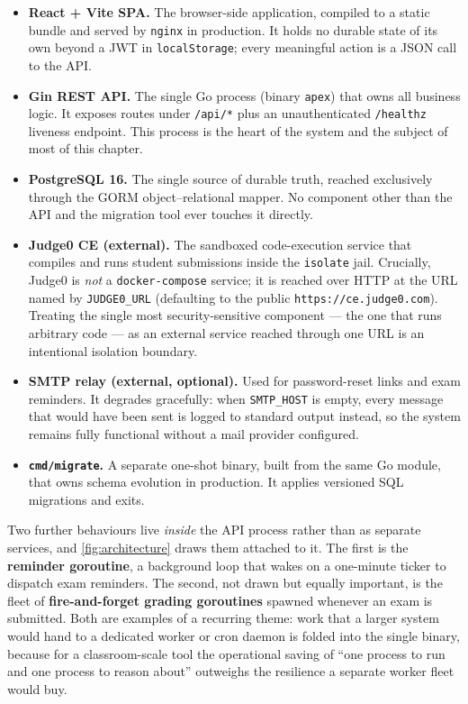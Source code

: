 \begin{itemize}
  \item \textbf{React + Vite SPA.} The browser-side application, compiled to a
        static bundle and served by \texttt{nginx} in production. It holds no
        durable state of its own beyond a JWT in \texttt{localStorage}; every
        meaningful action is a JSON call to the API.
  \item \textbf{Gin REST API.} The single Go process (binary \texttt{apex})
        that owns all business logic. It exposes routes under \texttt{/api/*}
        plus an unauthenticated \texttt{/healthz} liveness endpoint. This
        process is the heart of the system and the subject of most of this
        chapter.
  \item \textbf{PostgreSQL 16.} The single source of durable truth, reached
        exclusively through the GORM object--relational mapper. No component
        other than the API and the migration tool ever touches it directly.
  \item \textbf{Judge0 CE (external).} The sandboxed code-execution service
        that compiles and runs student submissions inside the \texttt{isolate}
        jail. Crucially, Judge0 is \emph{not} a \texttt{docker-compose} service;
        it is reached over HTTP at the URL named by \texttt{JUDGE0\_URL}
        (defaulting to the public \texttt{https://ce.judge0.com}). Treating the
        single most security-sensitive component --- the one that runs
        arbitrary code --- as an external service reached through one URL is an
        intentional isolation boundary.
  \item \textbf{SMTP relay (external, optional).} Used for password-reset links
        and exam reminders. It degrades gracefully: when \texttt{SMTP\_HOST} is
        empty, every message that would have been sent is logged to standard
        output instead, so the system remains fully functional without a mail
        provider configured.
  \item \textbf{\texttt{cmd/migrate}.} A separate one-shot binary, built from
        the same Go module, that owns schema evolution in production. It applies
        versioned SQL migrations and exits.
\end{itemize}

Two further behaviours live \emph{inside} the API process rather than as
separate services, and \cref{fig:architecture} draws them attached to it. The
first is the \textbf{reminder goroutine}, a background loop that wakes on a
one-minute ticker to dispatch exam reminders. The second, not drawn but equally
important, is the fleet of \textbf{fire-and-forget grading goroutines} spawned
whenever an exam is submitted. Both are examples of a recurring theme: work
that a larger system would hand to a dedicated worker or cron daemon is folded
into the single binary, because for a classroom-scale tool the operational
saving of ``one process to run and one process to reason about'' outweighs the
resilience a separate worker fleet would buy.

